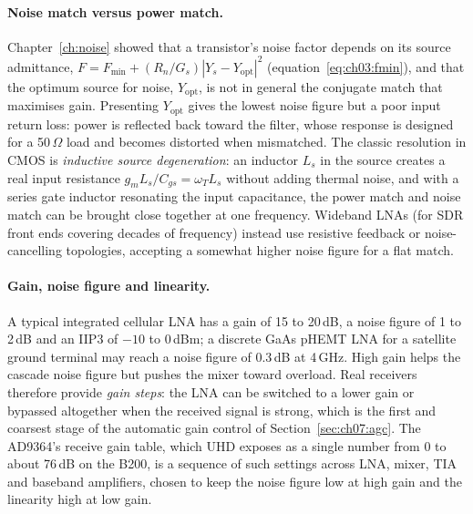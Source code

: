 \paragraph{Noise match versus power match.} Chapter~\ref{ch:noise} showed that a transistor's noise
factor depends on its source admittance, $F=F_{\min}+(R_n/G_s)|Y_s-Y_{\text{opt}}|^2$
(equation~\eqref{eq:ch03:fmin}), and that the optimum source for noise, $Y_{\text{opt}}$, is not in
general the conjugate match that maximises gain. Presenting $Y_{\text{opt}}$ gives the lowest noise
figure but a poor input return loss: power is reflected back toward the filter, whose response is
designed for a 50\,$\Omega$ load and becomes distorted when mismatched. The classic resolution in CMOS
is \emph{inductive source degeneration}: an inductor $L_s$ in the source creates a real input resistance
$g_mL_s/C_{gs}=\omega_TL_s$ without adding thermal noise, and with a series gate inductor resonating the
input capacitance, the power match and noise match can be brought close together at one frequency.
Wideband LNAs (for SDR front ends covering decades of frequency) instead use resistive feedback or
noise-cancelling topologies, accepting a somewhat higher noise figure for a flat match.

\paragraph{Gain, noise figure and linearity.} A typical integrated cellular LNA has a gain of 15 to
20\,dB, a noise figure of 1 to 2\,dB and an IIP3 of $-10$ to 0\,dBm; a discrete GaAs pHEMT LNA for a
satellite ground terminal may reach a noise figure of 0.3\,dB at 4\,GHz. High gain helps the cascade
noise figure but pushes the mixer toward overload. Real receivers therefore provide \emph{gain steps}:
the LNA can be switched to a lower gain or bypassed altogether when the received signal is strong,
which is the first and coarsest stage of the automatic gain control of Section~\ref{sec:ch07:agc}.
The AD9364's receive gain table, which UHD exposes as a single number from 0 to about 76\,dB on the B200,
is a sequence of such settings across LNA, mixer, TIA and baseband amplifiers, chosen to keep the noise
figure low at high gain and the linearity high at low gain.


